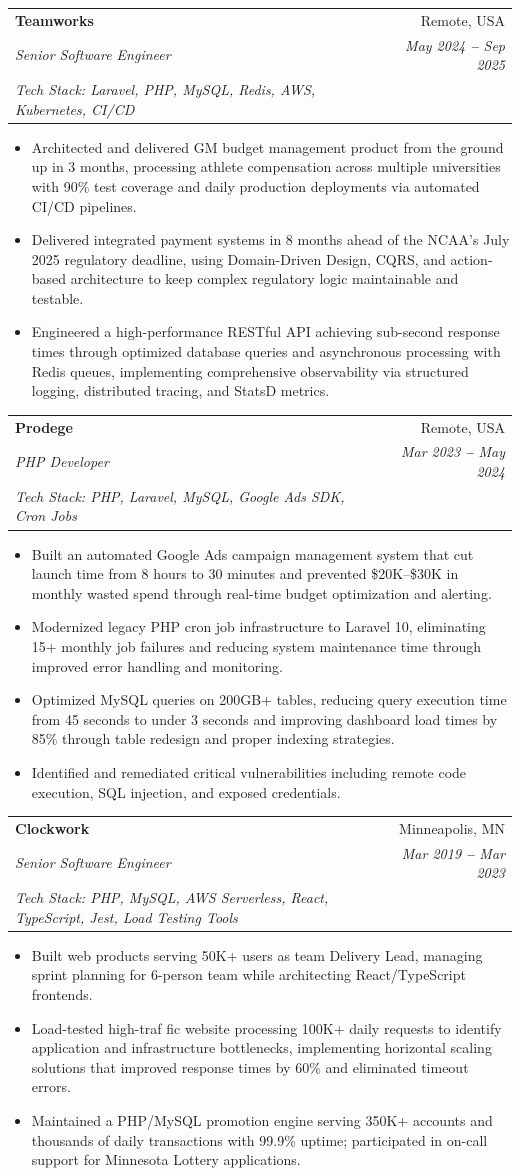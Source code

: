 \documentclass[letterpaper,11pt]{article}
\makeatletter
\newcommand{\resumeItem}[1]{
    \item\small{
            {#1 \vspace{-2pt}}
    }
}
\newcommand{\resumeSubheading}[5]{
    \vspace{-2pt}\item
    \begin{tabular*}{0.97\textwidth}[t]{l@{\extracolsep{\fill}}r}
    \textbf{#1} & #2 \\
    \textit{\small#3} & \textit{\small #4} \\
    \textit{\small#5} \\
    \end{tabular*}\vspace{-7pt}
}
\newcommand{\resumeItemListStart}{\begin{itemize}}
\newcommand{\resumeItemListEnd}{\end{itemize}\vspace{-5pt}}
\makeatother
\begin{document}
    \newpage
    \resumeSubheading%
    {Teamworks}{Remote, USA}
    {Senior Software Engineer}{May 2024 \textbf{--} Sep 2025}
    {Tech Stack: Laravel, PHP, MySQL, Redis, AWS, Kubernetes, CI/CD}
    \resumeItemListStart{}
    \resumeItem{Architected and delivered GM budget management product from the ground up in 3 months, processing athlete compensation across multiple universities with 90\% test coverage and daily production deployments via automated CI/CD pipelines.}
    \resumeItem{Delivered integrated payment systems in 8 months ahead of the NCAA's July 2025 regulatory deadline, using Domain-Driven Design, CQRS, and action-based architecture to keep complex regulatory logic maintainable and testable.}
    \resumeItem{Engineered a high-performance RESTful API achieving sub-second response times through optimized database queries and asynchronous processing with Redis queues, implementing comprehensive observability via structured logging, distributed tracing, and StatsD metrics.}
    \resumeItemListEnd{}

    \resumeSubheading%
    {Prodege}{Remote, USA}
    {PHP Developer}{Mar 2023 \textbf{--} May 2024}
    {Tech Stack: PHP, Laravel, MySQL, Google Ads SDK, Cron Jobs}
    \resumeItemListStart{}
    \resumeItem{Built an automated Google Ads campaign management system that cut launch time from 8 hours to 30 minutes and prevented \$20K--\$30K in monthly wasted spend through real-time budget optimization and alerting.}
    \resumeItem{Modernized legacy PHP cron job infrastructure to Laravel 10, eliminating 15+ monthly job failures and reducing system maintenance time through improved error handling and monitoring.}
    \resumeItem{Optimized MySQL queries on 200GB+ tables, reducing query execution time from 45 seconds to under 3 seconds and improving dashboard load times by 85\% through table redesign and proper indexing strategies.}
    \resumeItem{Identified and remediated critical vulnerabilities including remote code execution, SQL injection, and exposed credentials.}
    \resumeItemListEnd{}

    \resumeSubheading%
    {Clockwork}{Minneapolis, MN}
    {Senior Software Engineer}{Mar 2019 \textbf{--} Mar 2023}
    {Tech Stack: PHP, MySQL, AWS Serverless, React, TypeScript, Jest, Load Testing Tools}
    \resumeItemListStart{}
    \resumeItem{Built web products serving 50K+ users as team Delivery Lead, managing sprint planning for 6-person team while architecting React/TypeScript frontends.}
    \resumeItem{Load-tested high-traf\kern0pt fic website processing 100K+ daily requests to identify application and infrastructure bottlenecks, implementing horizontal scaling solutions that improved response times by 60\% and eliminated timeout errors.}
    \resumeItem{Maintained a PHP/MySQL promotion engine serving 350K+ accounts and thousands of daily transactions with 99.9\% uptime; participated in on-call support for Minnesota Lottery applications.}
    \resumeItemListEnd{}
\end{document}
